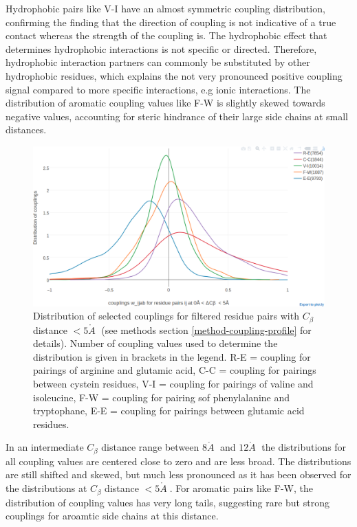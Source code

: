 \documentclass[12pt,a4paper,twoside]{book}
\newcommand{\Cb}{C_\beta}
\newcommand{\angstrom}{\mathring{A} \;}
\theoremstyle{definition}
\theoremstyle{definition}
\theoremstyle{remark}
\begin{document}
Hydrophobic pairs like V-I have an almost symmetric coupling
distribution, confirming the finding that the direction of coupling is
not indicative of a true contact whereas the strength of the coupling
is. The hydrophobic effect that determines hydrophobic interactions is
not specific or directed. Therefore, hydrophobic interaction partners
can commonly be substituted by other hydrophobic residues, which
explains the not very pronounced positive coupling signal compared to
more specific interactions, e.g ionic interactions. The distribution of
aromatic coupling values like F-W is slightly skewed towards negative
values, accounting for steric hindrance of their large side chains at
small distances.











\begin{figure}

{\centering \includegraphics[width=0.9\linewidth]{img/coupling_matrix_analysis/1d_coupling_profile_0_5} 

}

\caption{Distribution of selected couplings
for filtered residue pairs with \(\Cb\) distance \(< 5\angstrom\) (see
methods section \ref{method-coupling-profile} for details). Number of
coupling values used to determine the distribution is given in brackets
in the legend. R-E = coupling for pairings of arginine and glutamic
acid, C-C = coupling for pairings between cystein residues, V-I =
coupling for pairings of valine and isoleucine, F-W = coupling for
pairing sof phenylalanine and tryptophane, E-E = coupling for pairings
between glutamic acid residues.}\label{fig:1d-coupling-profile-0-5}
\end{figure}

In an intermediate \(\Cb\) distance range between \(8\angstrom\) and
\(12\angstrom\) the distributions for all coupling values are centered
close to zero and are less broad. The distributions are still shifted
and skewed, but much less pronounced as it has been observed for the
distributions at \(\Cb\) distance \(< 5\angstrom\). For aromatic pairs
like F-W, the distribution of coupling values has very long tails,
suggesting rare but strong couplings for aroamtic side chains at this
distance.
\end{document}
